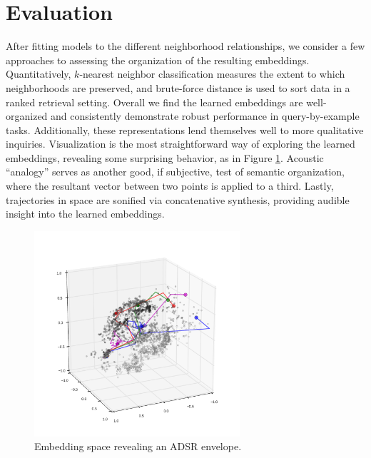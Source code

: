 \documentclass{article}
\begin{document}
\section{Evaluation}

After fitting models to the different neighborhood relationships, we consider a few approaches to assessing the organization of the resulting embeddings.
Quantitatively, $k$-nearest neighbor classification measures the extent to which neighborhoods are preserved, and brute-force distance is used to sort data in a ranked retrieval setting.
Overall we find the learned embeddings are well-organized and consistently demonstrate robust performance in query-by-example tasks.
Additionally, these representations lend themselves well to more qualitative inquiries.
Visualization is the most straightforward way of exploring the learned embeddings, revealing some surprising behavior, as in Figure \ref{fig:asdr}.
Acoustic ``analogy'' serves as another good, if subjective, test of semantic organization, where the resultant vector between two points is applied to a third.
Lastly, trajectories in space are sonified via concatenative synthesis, providing audible insight into the learned embeddings.



\begin{figure}[!t]
\vskip -0.2in
\begin{center}
\centerline{\includegraphics[width=3in]{inst-pitch-d2_adsr.pdf}}
\vskip -0.2in
\caption{Embedding space revealing an ADSR envelope.}
\label{fig:asdr}
\end{center}
\vskip -0.2in
\end{figure}
\end{document}
